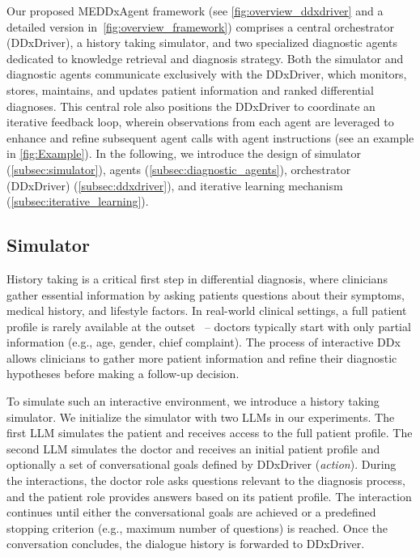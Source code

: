 Our proposed MEDDxAgent framework (see \autoref{fig:overview_ddxdriver} and a detailed version in~\autoref{fig:overview_framework}) comprises a central orchestrator (DDxDriver), a history taking simulator, and two specialized diagnostic agents dedicated to knowledge retrieval and diagnosis strategy. Both the simulator and diagnostic agents communicate exclusively with the DDxDriver, which monitors, stores, maintains, and updates patient information and ranked differential diagnoses. This central role also positions the DDxDriver to coordinate an iterative feedback loop, wherein observations from each agent are leveraged to enhance and refine subsequent agent calls with agent instructions (see an example in \autoref{fig:Example}). In the following, we introduce the design of simulator (\autoref{subsec:simulator}), agents (\autoref{subsec:diagnostic_agents}), orchestrator (DDxDriver) (\autoref{subsec:ddxdriver}), and iterative learning mechanism  (\autoref{subsec:iterative_learning}).

\subsection{Simulator}
\label{subsec:simulator}

History taking is a critical first step in differential diagnosis, where clinicians gather essential information by asking patients questions about their symptoms, medical history, and lifestyle factors. In real-world clinical settings, a full patient profile is rarely available at the outset~\citep{li2024mediq} -- doctors typically start with only partial information (e.g., age, gender, chief complaint). The process of interactive DDx allows clinicians to gather more patient information and refine their diagnostic hypotheses before making a follow-up decision. 

To simulate such an interactive environment, we introduce a history taking simulator. We initialize the simulator with two LLMs \cite{wu2023large} in our experiments. The first LLM simulates the patient and receives access to the full patient profile. The second LLM simulates the doctor and receives an initial patient profile and optionally a set of conversational goals defined by DDxDriver (\textit{action}). During the interactions, the doctor role asks questions relevant to the diagnosis process, and the patient role provides answers based on its patient profile. 
The interaction continues until either the conversational goals are achieved or a predefined stopping criterion (e.g., maximum number of questions) is reached. Once the conversation concludes, the dialogue history is forwarded to DDxDriver.  


